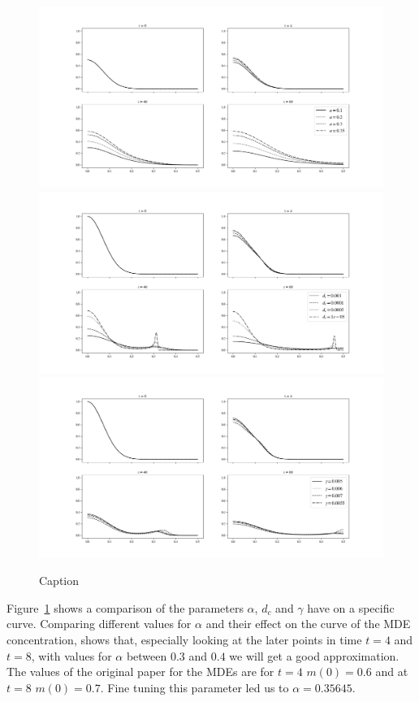 \begin{figure}[h]
    \centering
    \includegraphics[width=\textwidth]{resources/images/alpha_comparison.png}
    \includegraphics[width=\textwidth]{resources/images/dc_comparison.png}
    \includegraphics[width=\textwidth]{resources/images/gamma_comparison.png}
    \caption{Caption}
    \label{fig:replication_comparison}
\end{figure}
Figure~\ref{fig:replication_comparison} shows a comparison of the parameters $\alpha$, $d_c$ and $\gamma$ have on a specific curve. Comparing different values for $\alpha$ and their effect on the curve of the MDE concentration, shows that, especially looking at the later points in time $t=4$ and $t=8$, with values for $\alpha$ between $0.3$ and $0.4$ we will get a good approximation. The values of the original paper for the MDEs are for $t=4$ $m(0)=0.6$ and at $t=8$ $m(0)=0.7$. Fine tuning this parameter led us to $\alpha=0.35645$.\newline 
